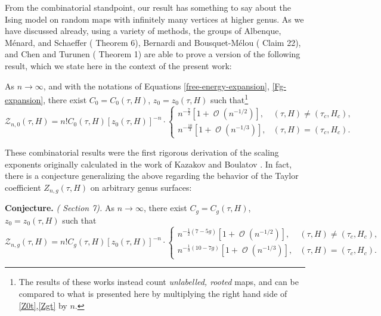 \documentclass[usenames,dvipsnames]{article}
\theoremstyle{definition}
\DeclareMathOperator{\OO}{\mathcal{O}}
\numberwithin{equation}{section}
\numberwithin{figure}{section}
\begin{document}
From the combinatorial standpoint, our result has something to say about the Ising model on random maps with infinitely many vertices at higher genus. As we have discussed already, using a variety of methods, the groups of Albenque, M\'{e}nard, and Schaeffer (\cite{AM} Theorem 6), Bernardi and Bousquet-M\'{e}lou (\cite{BBM} Claim 22), and Chen and Turunen (\cite{CT1} Theorem 1) are able to prove a version of the following result, which we state here in the context of the present work:\vspace{2mm}

\noindent
        As $n\to \infty$, and with the notations of Equations \eqref{free-energy-expansion}, \eqref{Fg-expansion}, there exist $C_0 = C_0(\tau,H)$, $z_0 = z_0(\tau,H)$ such that\footnote{The results of these works instead count \textit{unlabelled, rooted} maps, and can be compared to what is presented here by multiplying the right hand side of \eqref{Z0t},\eqref{Zgt} by $n$.}
            \begin{equation}\label{Z0t}
                \mathcal{Z}_{n,0}(\tau,H) = 
                n!C_0(\tau,H) [z_0(\tau,H)]^{-n} 
                \cdot \begin{cases}
                    n^{-\frac{7}{2}}[1+\OO(n^{-1/2})], & (\tau,H) \neq (\tau_c,H_c),\\
                    n^{-\frac{10}{3}} [1+\OO(n^{-1/3})], & (\tau,H) = (\tau_c,H_c).
                \end{cases}
            \end{equation}

These combinatorial results were the first rigorous derivation of the scaling exponents originally calculated in the work of Kazakov and Boulatov \cite{Kazakov1,Kazakov2}. In fact, there is a conjecture generalizing the above \cite{Kostov,Duplantier,PGZ} regarding the behavior of the Taylor coefficient $Z_{n,g}(\tau,H)$ on arbitrary genus surfaces: \vspace{2mm}

\noindent
\textbf{Conjecture.} \textit{(\cite{PGZ} Section 7).}
        As $n\to \infty$, there exist $C_g = C_g(\tau,H)$, $z_0 = z_0(\tau,H)$ such that
        \begin{equation}\label{Zgt}
                \mathcal{Z}_{n,g}(\tau,H) = 
                n!C_g(\tau,H) [z_0(\tau,H)]^{-n} \cdot 
                \begin{cases}
                     n^{-\frac{1}{2}(7-5g)}[1+\OO(n^{-1/2})], & (\tau,H) \neq (\tau_c,H_c),\\
                     n^{-\frac{1}{3}(10-7g)} [1+\OO(n^{-1/3})], & (\tau,H) = (\tau_c,H_c).
                \end{cases}
            \end{equation}
\end{document}
